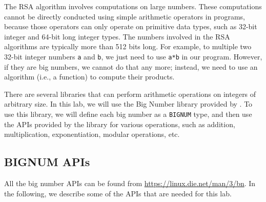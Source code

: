 The RSA algorithm involves computations on large numbers. These computations
cannot be directly conducted using simple arithmetic operators in programs, because those
operators can only operate on primitive data types, such as 32-bit integer and 64-bit long
integer types. The numbers involved in the RSA algorithms are typically more than 512 bits
long. For example, to multiple two 32-bit integer numbers \texttt{a} and \texttt{b},
we just need to use \texttt{a*b} in our program. However, if they are big numbers, we cannot
do that any more; instead, we need to use an algorithm (i.e., a function) to compute
their products.


There are several libraries that can perform arithmetic operations on integers of
arbitrary size. In this lab, we will use the Big Number library provided
by \openssl. To use this library, we will define each big number as
a \texttt{BIGNUM} type, and then use the APIs provided by the library
for various operations, such as addition, multiplication, exponentiation,
modular operations, etc.



\subsection{BIGNUM APIs}

All the big number APIs can be found from
\url{https://linux.die.net/man/3/bn}. In the following,
we describe some of the APIs that are needed for this lab.



